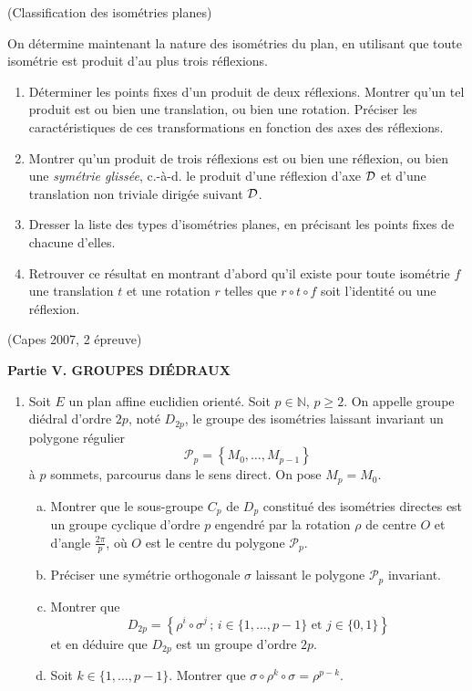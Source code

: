 \documentclass[a4paper,11pt,reqno]{amsart}
\begin{document}
\begin{exo} (Classification des isométries planes)

  On détermine maintenant la nature des isométries du plan, en utilisant que toute isométrie est produit d'au plus trois réflexions.
  \begin{enumerate}
    \item Déterminer les points fixes d'un produit de deux réflexions. Montrer qu'un tel produit est ou bien une translation, ou bien une rotation. Préciser les caractéristiques de ces transformations en fonction des axes des réflexions.
    \item Montrer qu'un produit de trois réflexions est ou bien une réflexion, ou bien une \emph{symétrie glissée}, c.-à-d. le produit d'une réflexion d'axe $\mathcal{D}$ et d'une translation non triviale dirigée suivant $\mathcal{D}$.
    \item Dresser la liste des types d'isométries planes, en précisant les points fixes de chacune d'elles.
    \item Retrouver ce résultat en montrant d'abord qu'il  existe pour toute isométrie $f$ une translation $t$ et une rotation $r$ telles que $r \circ t \circ f$ soit l'identité ou une réflexion.
  \end{enumerate}
\end{exo}

\begin{exo} (Capes 2007, 2\ieme{} épreuve)

  \begin{center}
    \textbf{Partie V. GROUPES DIÉDRAUX}
  \end{center}
  \begin{enumerate}[\textbf{1)}]
    \item Soit $E$ un plan affine euclidien orienté. Soit $p \in \mathbb{N}$, $p \geq 2$. On appelle groupe diédral d'ordre $2p$, noté $D_{2p}$, le groupe des isométries laissant invariant un polygone régulier
    \[
      \mathcal{P}_{p}=\left\{M_{0},\ldots,M_{p-1}\right\}
    \]
    à $p$ sommets, parcourus dans le sens direct. On pose $M_{p}=M_{0}$.
    \begin{enumerate}[a)]
      \item Montrer que le sous-groupe $C_{p}$ de $D_{p}$ constitué des isométries directes est un groupe cyclique d'ordre $p$ engendré par la rotation $\rho$ de centre $O$ et d'angle $\frac{2 \pi}{p}$, où $O$ est le centre du polygone $\mathcal{P}_{p}$.
      \item Préciser une symétrie orthogonale $\sigma$ laissant le polygone $\mathcal{P}_{p}$ invariant.
      \item Montrer que
      \[
        D_{2p} =
        \left\{
          \rho^{i}\circ \sigma^{j} \,;\, i \in \{1,\ldots,p-1\} \text{ et } j \in \{0,1\}
        \right\}
      \]
      et en déduire que $D_{2p}$ est un groupe d'ordre $2p$.
      \item Soit $k \in \{1,\ldots,p-1\}$. Montrer que $\sigma \circ \rho^{k} \circ \sigma = \rho^{p-k}$.
    \end{enumerate}
  \end{enumerate}
\end{exo}
\end{document}
